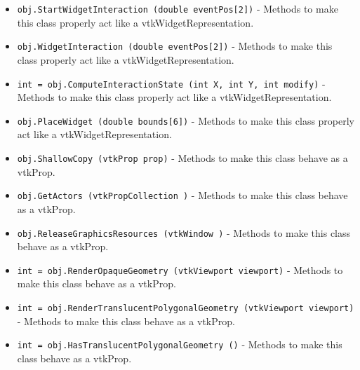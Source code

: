 \begin{itemize}
\item  \verb|obj.StartWidgetInteraction (double eventPos[2])| -  Methods to make this class properly act like a vtkWidgetRepresentation.

\item  \verb|obj.WidgetInteraction (double eventPos[2])| -  Methods to make this class properly act like a vtkWidgetRepresentation.

\item  \verb|int = obj.ComputeInteractionState (int X, int Y, int modify)| -  Methods to make this class properly act like a vtkWidgetRepresentation.

\item  \verb|obj.PlaceWidget (double bounds[6])| -  Methods to make this class properly act like a vtkWidgetRepresentation.

\item  \verb|obj.ShallowCopy (vtkProp prop)| -  Methods to make this class behave as a vtkProp.

\item  \verb|obj.GetActors (vtkPropCollection )| -  Methods to make this class behave as a vtkProp.

\item  \verb|obj.ReleaseGraphicsResources (vtkWindow )| -  Methods to make this class behave as a vtkProp.

\item  \verb|int = obj.RenderOpaqueGeometry (vtkViewport viewport)| -  Methods to make this class behave as a vtkProp.

\item  \verb|int = obj.RenderTranslucentPolygonalGeometry (vtkViewport viewport)| -  Methods to make this class behave as a vtkProp.

\item  \verb|int = obj.HasTranslucentPolygonalGeometry ()| -  Methods to make this class behave as a vtkProp.

\end{itemize}
